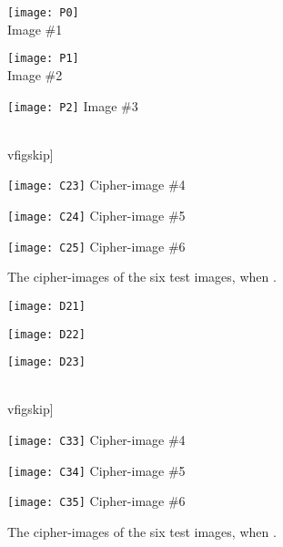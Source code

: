 \documentclass[final,3p,times,twocolumn]{elsarticle}
\newlength\figwidth
\newlength\sfigwidth
\newlength\vfigskip
\begin{document}
\begin{figure}[!htb]
\centering
\begin{minipage}{\sfigwidth}
\centering
\texttt{[image: P0]}\\
Image \#1
\end{minipage}
\begin{minipage}{\sfigwidth}
\centering
\texttt{[image: P1]}\\
Image \#2
\end{minipage}
\begin{minipage}{\sfigwidth}
\centering
\texttt{[image: P2]}
Image \#3
\end{minipage}\\vfigskip]
\begin{minipage}{\sfigwidth}
\centering
\texttt{[image: C23]}
Cipher-image \#4
\end{minipage}
\begin{minipage}{\sfigwidth}
\centering
\texttt{[image: C24]}
Cipher-image \#5
\end{minipage}
\begin{minipage}{\sfigwidth}
\centering
\texttt{[image: C25]}
Cipher-image \#6
\end{minipage}
\caption{The cipher-images of the six  test images,
when .} \label{figure:Experiment32}
\end{figure}

\begin{figure}[!htb]
\centering
\begin{minipage}{\sfigwidth}
\centering
\texttt{[image: D21]}\\

\end{minipage}
\begin{minipage}{\sfigwidth}
\centering
\texttt{[image: D22]}\\

\end{minipage}
\begin{minipage}{\sfigwidth}
\centering
\texttt{[image: D23]}

\end{minipage}\\vfigskip]
\begin{minipage}{\sfigwidth}
\centering
\texttt{[image: C33]}
Cipher-image \#4
\end{minipage}
\begin{minipage}{\sfigwidth}
\centering
\texttt{[image: C34]}
Cipher-image \#5
\end{minipage}
\begin{minipage}{\sfigwidth}
\centering
\texttt{[image: C35]}
Cipher-image \#6
\end{minipage}
\caption{The cipher-images of the six  test images,
when .} \label{figure:Experiment16}
\end{figure}
\end{document}
